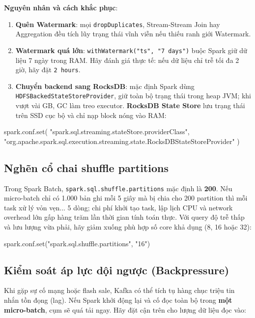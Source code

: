 \documentclass[12pt]{article}
\begin{document}
\textbf{Nguyên nhân và cách khắc phục}:
\begin{enumerate}
    \item \textbf{Quên Watermark}: mọi \texttt{dropDuplicates}, Stream-Stream Join hay Aggregation đều tích lũy trạng thái vĩnh viễn nếu thiếu ranh giới Watermark.
    \item \textbf{Watermark quá lớn}: \texttt{withWatermark("ts", "7 days")} buộc Spark giữ dữ liệu 7 ngày trong RAM. Hãy đánh giá thực tế: nếu dữ liệu chỉ trễ tối đa 2 giờ, hãy đặt \texttt{2 hours}.
    \item \textbf{Chuyển backend sang RocksDB}: mặc định Spark dùng \texttt{HDFSBackedStateStoreProvider}, giữ toàn bộ trạng thái trong heap JVM; khi vượt vài GB, GC làm treo executor. \textbf{RocksDB State Store} lưu trạng thái trên SSD cục bộ và chỉ nạp block nóng vào RAM:
\end{enumerate}

\begin{aivnpybox}
spark.conf.set(
    "spark.sql.streaming.stateStore.providerClass",
    "org.apache.spark.sql.execution.streaming.state.RocksDBStateStoreProvider"
)
\end{aivnpybox}

\subsection{Nghẽn cổ chai shuffle partitions}

Trong Spark Batch, \texttt{spark.sql.shuffle.partitions} mặc định là \textbf{200}. Nếu micro-batch chỉ có 1.000 bản ghi mỗi 5 giây mà bị chia cho 200 partition thì mỗi task xử lý vỏn vẹn... 5 dòng; chi phí khởi tạo task, lập lịch CPU và network overhead lớn gấp hàng trăm lần thời gian tính toán thực. Với query độ trễ thấp và lưu lượng vừa phải, hãy giảm xuống phù hợp số core khả dụng (8, 16 hoặc 32):

\begin{aivnpybox}
spark.conf.set("spark.sql.shuffle.partitions", "16")
\end{aivnpybox}

\subsection{Kiểm soát áp lực dội ngược (Backpressure)}

Khi gặp sự cố mạng hoặc flash sale, Kafka có thể tích tụ hàng chục triệu tin nhắn tồn đọng (lag). Nếu Spark khởi động lại và cố đọc toàn bộ trong \textbf{một micro-batch}, cụm sẽ quá tải ngay. Hãy đặt cận trên cho lượng dữ liệu đọc vào:
\end{document}
